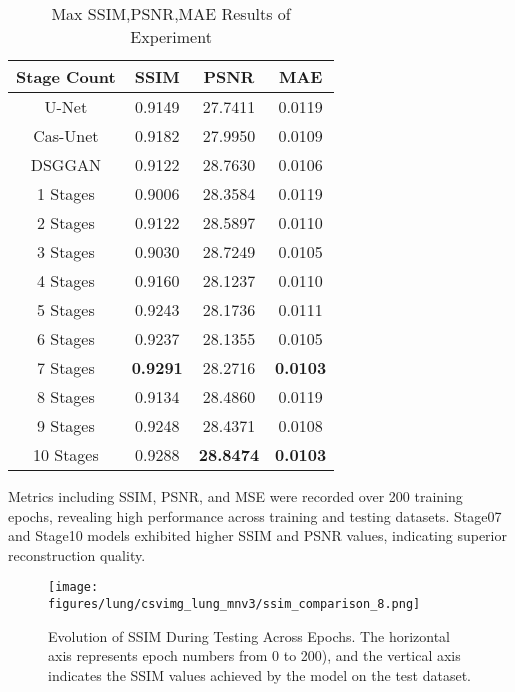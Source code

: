 \documentclass[a4paper, times, 10pt,twocolumn]{article}
\begin{document}
\begin{table}[h]
	\centering
	\caption{Max SSIM,PSNR,MAE Results of Experiment}
	\label{tab:exps_result}
	\begin{tabular}{cccc}
		\hline
		Stage Count & SSIM            & PSNR             & MAE             \\
		\hline
		U-Net       & 0.9149          & 27.7411          & 0.0119          \\
		Cas-Unet    & 0.9182          & 27.9950          & 0.0109          \\
		DSGGAN      & 0.9122          & 28.7630          & 0.0106          \\
		1 Stages    & 0.9006          & 28.3584          & 0.0119          \\
		2 Stages    & 0.9122          & 28.5897          & 0.0110          \\
		3 Stages    & 0.9030          & 28.7249          & 0.0105          \\
		4 Stages    & 0.9160          & 28.1237          & 0.0110          \\
		5 Stages    & 0.9243          & 28.1736          & 0.0111          \\
		6 Stages    & 0.9237          & 28.1355          & 0.0105          \\
		7 Stages    & \textbf{0.9291} & 28.2716          & \textbf{0.0103} \\
		8 Stages    & 0.9134          & 28.4860          & 0.0119          \\
		9 Stages    & 0.9248          & 28.4371          & 0.0108          \\
		10 Stages   & 0.9288          & \textbf{28.8474} & \textbf{0.0103} \\
		\hline
	\end{tabular}
\end{table}

Metrics including SSIM, PSNR, and MSE were recorded over 200 training epochs, revealing high performance across training and testing datasets. Stage07 and Stage10 models exhibited higher SSIM and PSNR values, indicating superior reconstruction quality.

\begin{figure*}[h]
	\centering
	\texttt{[image: figures/lung/csvimg\_lung\_mnv3/ssim\_comparison\_8.png]}
	\caption[ssim]{Evolution of SSIM During Testing Across Epochs. The horizontal axis represents epoch numbers from 0 to 200), and the vertical axis indicates the SSIM values achieved by the model on the test dataset.}
	\label{fig:ssim}
\end{figure*}
\end{document}
